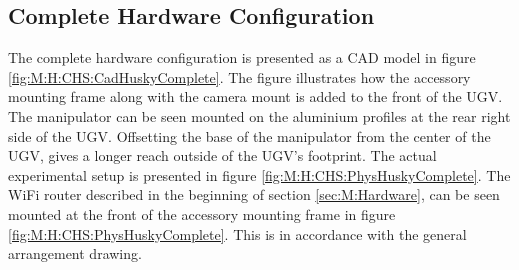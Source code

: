 
\subsection{Complete Hardware Configuration}
The complete hardware configuration is presented as a CAD model in figure \ref{fig:M:H:CHS:CadHuskyComplete}. The figure illustrates how the accessory mounting frame along with the camera mount is added to the front of the UGV. The manipulator can be seen mounted on the aluminium profiles at the rear right side of the UGV. Offsetting the base of the manipulator from the center of the UGV, gives a longer reach outside of the UGV's footprint. The actual experimental setup is presented in figure \ref{fig:M:H:CHS:PhysHuskyComplete}. The WiFi router described in the beginning of section \ref{sec:M:Hardware}, can be seen mounted at the front of the accessory mounting frame in figure \ref{fig:M:H:CHS:PhysHuskyComplete}. This is in accordance with the general arrangement drawing.

